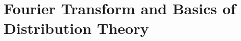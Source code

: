 \documentclass[../../script.tex]{subfiles}
\begin{document}
    \chapter{Fourier Transform and Basics of Distribution Theory}
    \vspace*{\fill}\par
    \pagebreak  

    
    
    
\end{document}
